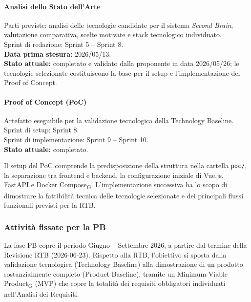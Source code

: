 \paragraph{Analisi dello Stato dell'Arte}
Parti previste: analisi delle tecnologie candidate per il sistema
\textit{Second Brain}, valutazione comparativa, scelte motivate e stack
tecnologico individuato.\\
Sprint di redazione: Sprint 5 -- Sprint 8.\\
\textbf{Data prima stesura:} 2026/05/13.\\
\textbf{Stato attuale:} completato e validato dalla proponente in data
2026/05/26; le tecnologie selezionate costituiscono la base per il setup e
l'implementazione del Proof of Concept.

\paragraph{Proof of Concept (PoC)}
Artefatto eseguibile per la validazione tecnologica della Technology Baseline.\\
Sprint di setup: Sprint 8.\\
Sprint di implementazione: Sprint 9 -- Sprint 10.\\
\textbf{Stato attuale:} completato.

Il setup del PoC comprende la predisposizione della struttura nella cartella
\texttt{poc/}, la separazione tra frontend e backend, la configurazione iniziale
di Vue.js, FastAPI e Docker Compose\textsubscript{G}. L'implementazione
successiva ha lo scopo di dimostrare la fattibilità tecnica delle tecnologie
selezionate e dei principali flussi funzionali previsti per la RTB.

\subsubsection{Attività fissate per la PB}
\label{sec:attivita-pb}

La fase PB copre il periodo Giugno -- Settembre 2026, a partire dal termine
della Revisione RTB (2026-06-23). Rispetto alla RTB, l'obiettivo si sposta
dalla validazione tecnologica (Technology Baseline) alla dimostrazione di un
prodotto sostanzialmente completo (Product Baseline), tramite un Minimum
Viable Product\textsubscript{G} (MVP) che copre la totalità dei requisiti
obbligatori individuati nell'Analisi dei Requisiti.

